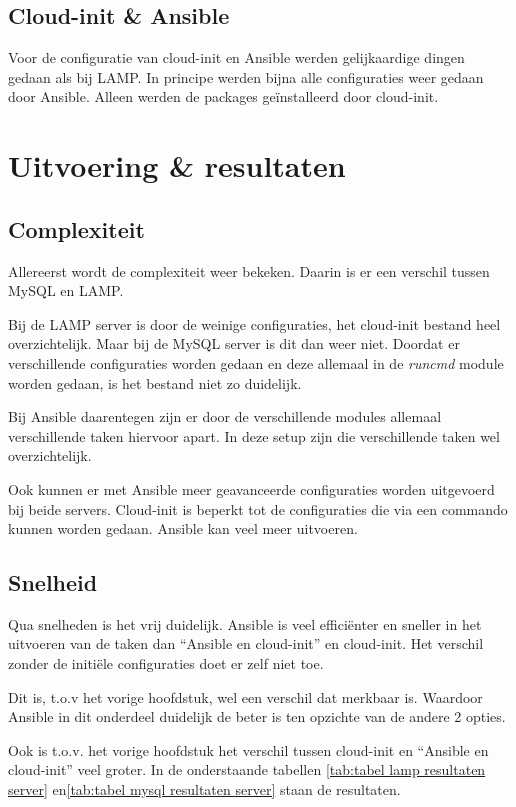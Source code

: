 \subsection{Cloud-init \& Ansible}
Voor de configuratie van cloud-init en Ansible werden gelijkaardige dingen gedaan als bij LAMP. In principe werden bijna alle configuraties weer gedaan door Ansible. Alleen werden de packages geïnstalleerd door cloud-init.

\section{Uitvoering \& resultaten}
\subsection{Complexiteit}
Allereerst wordt de complexiteit weer bekeken. Daarin is er een verschil tussen MySQL en LAMP.

Bij de LAMP server is door de weinige configuraties, het cloud-init bestand heel overzichtelijk. Maar bij de MySQL server is dit dan weer niet. Doordat er verschillende configuraties worden gedaan en deze allemaal in de \textit{runcmd} module worden gedaan, is het bestand niet zo duidelijk. 

Bij Ansible daarentegen zijn er door de verschillende modules allemaal verschillende taken hiervoor apart. In deze setup zijn die verschillende taken wel overzichtelijk. 

Ook kunnen er met Ansible meer geavanceerde configuraties worden uitgevoerd bij beide servers. Cloud-init is beperkt tot de configuraties die via een commando kunnen worden gedaan. Ansible kan veel meer uitvoeren. 

\newpage
\subsection{Snelheid}
Qua snelheden is het vrij duidelijk. Ansible is veel efficiënter en sneller in het uitvoeren van de taken dan ``Ansible en cloud-init'' en cloud-init. Het verschil zonder de initiële configuraties doet er zelf niet toe. 

Dit is, t.o.v het vorige hoofdstuk, wel een verschil dat merkbaar is. Waardoor Ansible in dit onderdeel duidelijk de beter is ten opzichte van de andere 2 opties.

Ook is t.o.v. het vorige hoofdstuk het verschil tussen cloud-init en ``Ansible en cloud-init'' veel groter. In de onderstaande tabellen \ref{tab:tabel lamp resultaten server} en\ref{tab:tabel mysql resultaten server} staan de resultaten.

